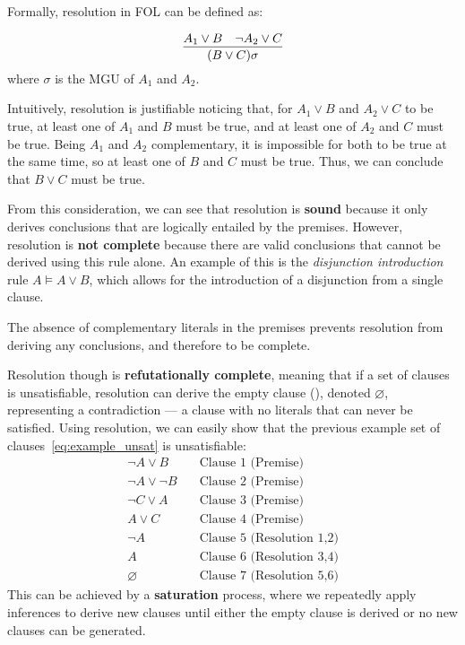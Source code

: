 Formally, resolution in FOL can be defined as:

\begin{equation}
  \infer{(B\lor C)\sigma}{A_1 \lor B & \neg A_2 \lor C}
\end{equation}
\indent where \(\sigma\) is the MGU of \(A_1\) and \(A_2\).

\noindent Intuitively, resolution is justifiable noticing that, for \(A_1 \lor B\) and \(A_2 \lor C\) to be true, at least one of \(A_1\) and \(B\) must be true, and at least one of \(A_2\) and \(C\) must be true.
Being \(A_1\) and \(A_2\) complementary, it is impossible for both to be true at the same time, so at least one of \(B\) and \(C\) must be true. Thus, we can conclude that \(B \lor C\) must be true.

From this consideration, we can see that resolution is \textbf{sound} because it only derives conclusions that are logically entailed by the premises.
However, resolution is \textbf{not complete} because there are valid conclusions that cannot be derived using this rule alone.
An example of this is the \emph{disjunction introduction} rule \(A \models A \lor B\), which allows for the introduction of a disjunction from a single clause.

The absence of complementary literals in the premises prevents resolution from deriving any conclusions, and therefore to be complete.

Resolution though is \textbf{refutationally complete}, meaning that if a set of clauses is unsatisfiable, resolution can derive the empty clause (\citeauthor{robinson1965}\cite{robinson1965}), denoted \(\varnothing\), representing a contradiction --- a clause with no literals that can never be satisfied.
Using resolution, we can easily show that the previous example set of clauses~\ref{eq:example_unsat} is unsatisfiable:
\begin{equation}
  \begin{aligned}
    \neg A \lor B &\quad \text{Clause 1 (Premise)} \\
    \neg A \lor \neg B &\quad \text{Clause 2 (Premise)} \\
    \neg C \lor A &\quad \text{Clause 3 (Premise)} \\
    A \lor C &\quad \text{Clause 4 (Premise)} \\
    \neg A &\quad \text{Clause 5 (Resolution 1,2)} \\
    A &\quad \text{Clause 6 (Resolution 3,4)} \\
    \varnothing &\quad \text{Clause 7 (Resolution 5,6)}
  \end{aligned}
\end{equation}
This can be achieved by a \textbf{saturation} process, where we repeatedly apply inferences to derive new clauses until either the empty clause is derived or no new clauses can be generated.

